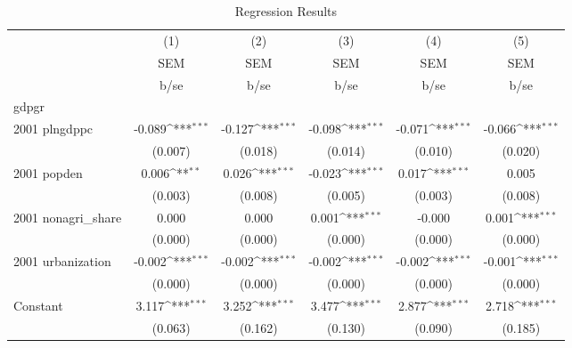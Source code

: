 \begin{table}[htbp]\centering
\def\sym#1{\ifmmode^{#1}\else\(^{#1}\)\fi}
\caption{Regression Results}
\begin{tabular}{l*{5}{c}}
\hline\hline
                    &\multicolumn{1}{c}{(1)}&\multicolumn{1}{c}{(2)}&\multicolumn{1}{c}{(3)}&\multicolumn{1}{c}{(4)}&\multicolumn{1}{c}{(5)}\\
                    &\multicolumn{1}{c}{SEM}&\multicolumn{1}{c}{SEM}&\multicolumn{1}{c}{SEM}&\multicolumn{1}{c}{SEM}&\multicolumn{1}{c}{SEM}\\
                    &        b/se         &        b/se         &        b/se         &        b/se         &        b/se         \\
\hline
gdpgr               &                     &                     &                     &                     &                     \\
2001 plngdppc       &      -0.089\sym{***}&      -0.127\sym{***}&      -0.098\sym{***}&      -0.071\sym{***}&      -0.066\sym{***}\\
                    &     (0.007)         &     (0.018)         &     (0.014)         &     (0.010)         &     (0.020)         \\
2001 popden         &       0.006\sym{**} &       0.026\sym{***}&      -0.023\sym{***}&       0.017\sym{***}&       0.005         \\
                    &     (0.003)         &     (0.008)         &     (0.005)         &     (0.003)         &     (0.008)         \\
2001 nonagri\_share  &       0.000         &       0.000         &       0.001\sym{***}&      -0.000         &       0.001\sym{***}\\
                    &     (0.000)         &     (0.000)         &     (0.000)         &     (0.000)         &     (0.000)         \\
2001 urbanization   &      -0.002\sym{***}&      -0.002\sym{***}&      -0.002\sym{***}&      -0.002\sym{***}&      -0.001\sym{***}\\
                    &     (0.000)         &     (0.000)         &     (0.000)         &     (0.000)         &     (0.000)         \\
Constant            &       3.117\sym{***}&       3.252\sym{***}&       3.477\sym{***}&       2.877\sym{***}&       2.718\sym{***}\\
                    &     (0.063)         &     (0.162)         &     (0.130)         &     (0.090)         &     (0.185)         \\

\end{tabular}
\end{table}
